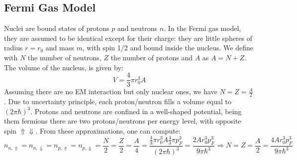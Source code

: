 \documentclass[10.75pt,a4paper,openright,bottom=2cm]{article}
\begin{document}
\subsection{Fermi Gas Model}
Nuclei are bound states of protons $p$ and neutrons $n$. In the Fermi gas model, they are assumed to be identical except for their charge: they are little spheres of radius $r=r_0$ and mass $m$, with spin 1/2 and bound inside the nucleus. We define with $N$ the number of neutrons, $Z$ the number of protons and $A$ as $A=N+Z$. The volume of the nucleus, is given by:
\[
V=\frac{4}{3}\pi r_0^3A
\]
Assuming there are no EM interaction but only nuclear ones, we have $N=Z=\frac{A}{2}$. Due to uncertainty principle, each proton/neutron fills a volume equal to $(2\pi\hbar)^3$. Protons and neutrons are confined in a well-shaped potential, being them fermions there are two protons/neutrons per energy level, with opposite spin $\Uparrow\Downarrow$. From these approximations, one can compute:
\[
n_{n,\Uparrow}=n_{n,\Downarrow}=n_{p,\Uparrow}=n_{p,\Downarrow}=\frac{N}{2}=\frac{Z}{2}=\frac{A}{4}=\frac{\frac{4}{3}\pi r_0^3A\frac{4}{3}\pi p_F^3}{(2\pi\hbar)^3}=\frac{2Ar_0^3p_F^3}{9\pi\hbar^3}\Rightarrow N=Z=\frac{A}{2}=\frac{4Ar_0^3p_F^3}{9\pi\hbar^3}
\]
\end{document}
